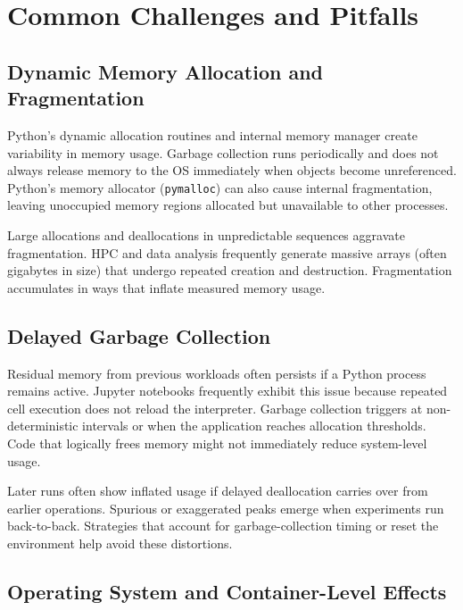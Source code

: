 \section{Common Challenges and Pitfalls}
\label{sec:appendix-common-challenges}

\subsection{Dynamic Memory Allocation and Fragmentation}
\label{subsec:appendix-dynamic-allocation}

Python's dynamic allocation routines and internal memory manager create variability in memory usage.
Garbage collection runs periodically and does not always release memory to the \ac{OS} immediately when objects become unreferenced.
Python's memory allocator (\texttt{pymalloc}) can also cause internal fragmentation, leaving unoccupied memory regions allocated but unavailable to other processes.

Large allocations and deallocations in unpredictable sequences aggravate fragmentation.
\ac{HPC} and data analysis frequently generate massive arrays (often gigabytes in size) that undergo repeated creation and destruction.
Fragmentation accumulates in ways that inflate measured memory usage.

\subsection{Delayed Garbage Collection}
\label{subsec:appendix-delayed-gc}

Residual memory from previous workloads often persists if a Python process remains active.
Jupyter notebooks frequently exhibit this issue because repeated cell execution does not reload the interpreter.
Garbage collection triggers at non-deterministic intervals or when the application reaches allocation thresholds.
Code that logically frees memory might not immediately reduce system-level usage.

Later runs often show inflated usage if delayed deallocation carries over from earlier operations.
Spurious or exaggerated peaks emerge when experiments run back-to-back.
Strategies that account for garbage-collection timing or reset the environment help avoid these distortions.

\subsection{Operating System and Container-Level Effects}
\label{subsec:appendix-os-effects}

